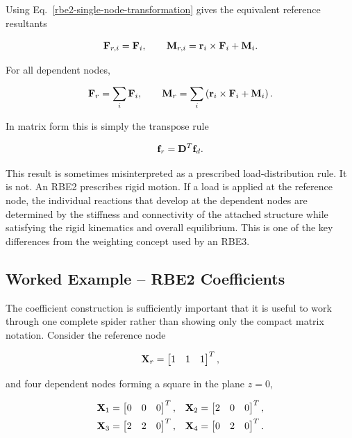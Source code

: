 Using Eq.~\eqref{rbe2-single-node-transformation} gives the equivalent reference
resultants

\begin{equation}\label{rbe2-load-transfer-single}
    \mathbf{F}_{r,i}=\mathbf{F}_i,
    \qquad
    \mathbf{M}_{r,i}=\mathbf{r}_i\times\mathbf{F}_i+\mathbf{M}_i.
\end{equation}

For all dependent nodes,

\begin{bbox}[0.90]
\begin{equation}\label{rbe2-load-transfer-resultant}
    \mathbf{F}_r=\sum_i\mathbf{F}_i,
    \qquad
    \mathbf{M}_r=\sum_i\left(\mathbf{r}_i\times\mathbf{F}_i+\mathbf{M}_i\right).
\end{equation}
\end{bbox}

In matrix form this is simply the transpose rule

\begin{equation}
    \mathbf{f}_r = \mathbf{D}^{T}\mathbf{f}_d.
\end{equation}

This result is sometimes misinterpreted as a prescribed load-distribution rule.
It is not. An RBE2 prescribes rigid motion. If a load is applied at the reference
node, the individual reactions that develop at the dependent nodes are determined
by the stiffness and connectivity of the attached structure while satisfying the
rigid kinematics and overall equilibrium. This is one of the key differences from
the weighting concept used by an RBE3.

\subsection{Worked Example -- RBE2 Coefficients}

The coefficient construction is sufficiently important that it is useful to work
through one complete spider rather than showing only the compact matrix notation.
Consider the reference node

\begin{equation}
    \mathbf{X}_r=
    \begin{bmatrix}
        1 & 1 & 1
    \end{bmatrix}^{T},
\end{equation}

and four dependent nodes forming a square in the plane $z=0$,

\begin{equation}
\begin{aligned}
    \mathbf{X}_1&=\begin{bmatrix}0&0&0\end{bmatrix}^{T}, &
    \mathbf{X}_2&=\begin{bmatrix}2&0&0\end{bmatrix}^{T},\\
    \mathbf{X}_3&=\begin{bmatrix}2&2&0\end{bmatrix}^{T}, &
    \mathbf{X}_4&=\begin{bmatrix}0&2&0\end{bmatrix}^{T}.
\end{aligned}
\end{equation}

